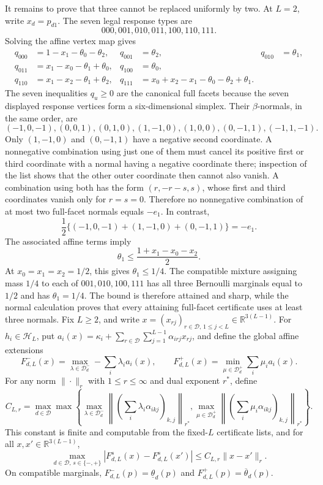 It remains to prove that three cannot be replaced uniformly by two.  At \(L=2\), write \(x_d=p_{d1}\).  The seven legal response types are
\[
 000,001,010,011,100,110,111.
\]
Solving the affine vertex map gives
\[
\begin{aligned}
 q_{000}&=1-x_1-\theta_0-\theta_2,&q_{001}&=\theta_2,&q_{010}&=\theta_1,\\
 q_{011}&=x_1-x_0-\theta_1+\theta_0,&q_{100}&=\theta_0,\\
 q_{110}&=x_1-x_2-\theta_1+\theta_2,&
 q_{111}&=x_0+x_2-x_1-\theta_0-\theta_2+\theta_1.
\end{aligned}
\]
The seven inequalities \(q_u\ge0\) are the canonical full facets because the seven displayed response vertices form a six-dimensional simplex.  Their \(\beta\)-normals, in the same order, are
\[
 (-1,0,-1),(0,0,1),(0,1,0),(1,-1,0),(1,0,0),(0,-1,1),(-1,1,-1).
\]
Only \((1,-1,0)\) and \((0,-1,1)\) have a negative second coordinate.  A nonnegative combination using just one of them must cancel its positive first or third coordinate with a normal having a negative coordinate there; inspection of the list shows that the other outer coordinate then cannot also vanish.  A combination using both has the form \((r,-r-s,s)\), whose first and third coordinates vanish only for \(r=s=0\).  Therefore no nonnegative combination of at most two full-facet normals equals \(-e_1\).  In contrast,
\[
 \frac12\{(-1,0,-1)+(1,-1,0)+(0,-1,1)\}=-e_1.
\]
The associated affine terms imply
\[
 \theta_1\le\frac{1+x_1-x_0-x_2}{2}.
\]
At \(x_0=x_1=x_2=1/2\), this gives \(\theta_1\le1/4\).  The compatible mixture assigning mass \(1/4\) to each of \(001,010,100,111\) has all three Bernoulli marginals equal to \(1/2\) and has \(\theta_1=1/4\).  The bound is therefore attained and sharp, while the normal calculation proves that every attaining full-facet certificate uses at least three normals.
Fix \(L\ge2\), and write \(x=(x_{rj})_{r\in\mathcal D,\,1\le j<L}\in\mathbb R^{3(L-1)}\).  For \(h_i\in\mathcal H_L\), put \(a_i(x)=\kappa_i+\sum_{r\in\mathcal D}\sum_{j=1}^{L-1}\alpha_{irj}x_{rj}\), and define the global affine extensions
\[
 F_{d,L}^-(x)=\max_{\lambda\in\mathcal D_d^-}-\sum_i\lambda_i a_i(x),
 \qquad
 F_{d,L}^+(x)=\min_{\mu\in\mathcal D_d^+}\sum_i\mu_i a_i(x).
\]
For any norm \(\|\cdot\|_r\) with \(1\le r\le\infty\) and dual exponent \(r^*\), define
\[
 C_{L,r}=\max_{d\in\mathcal D}\max\left\{
 \max_{\lambda\in\mathcal D_d^-}
 \left\|\left(\sum_i\lambda_i\alpha_{ikj}\right)_{k,j}\right\|_{r^*},
 \max_{\mu\in\mathcal D_d^+}
 \left\|\left(\sum_i\mu_i\alpha_{ikj}\right)_{k,j}\right\|_{r^*}
 \right\}.
\]
This constant is finite and computable from the fixed-\(L\) certificate lists, and for all \(x,x'\in\mathbb R^{3(L-1)}\),
\[
 \max_{d\in\mathcal D,\,s\in\{-,+\}}
 |F_{d,L}^s(x)-F_{d,L}^s(x')|\le C_{L,r}\|x-x'\|_r.
\]
On compatible marginals, \(F_{d,L}^-(p)=\underline\theta_d(p)\) and \(F_{d,L}^+(p)=\overline\theta_d(p)\).

